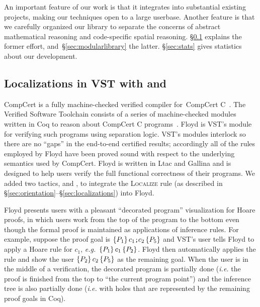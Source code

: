 \label{sec:vst}

An important feature of our work is that it integrates into 
substantial existing projects, making our techniques 
open to a large userbase. Another feature is that we 
carefully organized our library to separate the concerns of 
abstract mathematical reasoning and code-specific spatial reasoning.
\S\ref{sec:vstlocalunlocal} explains the former effort, and~\S\ref{sec:modularlibrary}
the latter. \S\ref{sec:stats} gives statistics about our development.

\subsection{Localizations in VST with  and }
\label{sec:vstlocalunlocal}
\vspace{-0.75ex}
CompCert is a fully machine-checked verified compiler for~CompCert C~\cite{leroy:compcert}.
The Verified Software Toolchain consists of a series of machine-checked modules written in Coq
to reason about CompCert C programs~\cite{appel:programlogics}.
Floyd is VST's module for verifying such programs using separation logic.
VST's modules interlock so there are no ``gaps'' in the end-to-end certified results;
accordingly all of the rules employed by Floyd have been proved sound with respect to
the underlying semantics used by CompCert.  Floyd is written in Ltac and Gallina and is
designed to help users verify the full functional correctness of their programs.
We added two tactics,  and , to
integrate the \textsc{Localize} rule (as described in \S\ref{sec:orientation}--\S\ref{sec:localizations}) into Floyd.

Floyd presents users with a pleasant ``decorated program'' visualization for Hoare proofs, in which users work from the top of the program to the bottom even though the formal proof is maintained as applications of inference rules.  For example, suppose the proof goal is $\{P_1\}\,c_1{\texttt{\small ;}}c_2\,\{P_5\}$ and VST's user tells Floyd to apply a Hoare rule for $c_1$, \emph{e.g.}~$\{P_1\}\,c_1\,\{P_2\}$.  Floyd then automatically applies the  rule and show the user $\{P_2\}\,c_2\,\{P_5\}$ as the remaining goal.
When the user is in the middle of a verification, the decorated program is partially done (\emph{i.e.} the proof is finished from the top to ``the current program point'') and the inference tree is also partially done (\emph{i.e.} with holes that are represented by the remaining proof goals in Coq).


